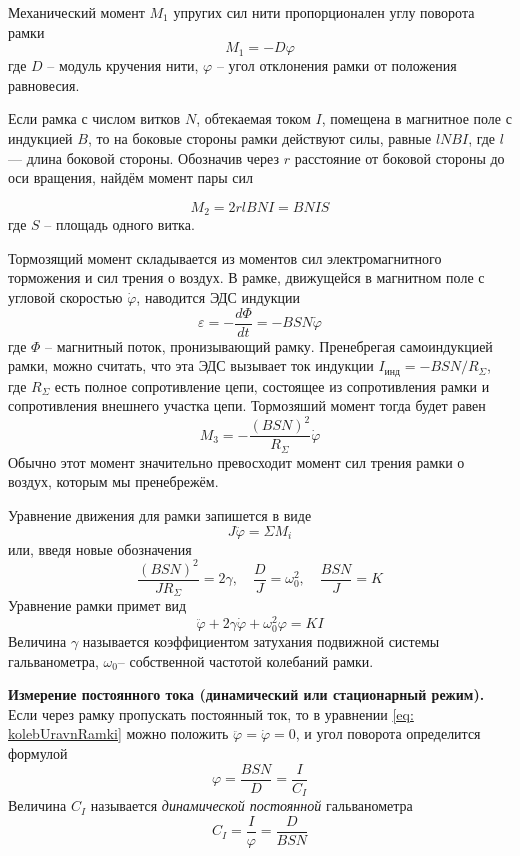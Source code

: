 \documentclass[a4paper,12pt]{article}
\begin{document}
Механический момент $M_1$ упругих сил нити пропорционален углу поворота рамки
\[M_1 = -D\varphi\]
где $D$ -- модуль кручения нити, $\varphi$ -- угол отклонения рамки от положения равновесия.

Если рамка с числом витков $N$, обтекаемая током $I$, помещена в магнитное поле с индукцией $B$, то на боковые стороны рамки действуют силы, равные $lNBI$, где $l$ — длина боковой стороны. Обозначив через $r$ расстояние от боковой стороны до оси вращения, найдём момент пары сил

\[M_2 = 2 r l B N I = B N I S\]
где $S$ -- площадь одного витка.

Тормозящий момент складывается из моментов сил электромагнитного торможения и сил трения о воздух. В рамке, движущейся в магнитном поле с угловой скоростью $\dot{\varphi}$, наводится ЭДС индукции
\[\varepsilon = - \frac{d\Phi}{dt} = - B S N \dot{\varphi} \]
где $\Phi$ -- магнитный поток, пронизывающий рамку. Пренебрегая самоиндукцией рамки, можно считать, что эта ЭДС вызывает ток индукции $I_{инд} = - B S N / R_\Sigma$, где $R_\Sigma$ есть полное сопротивление цепи, состоящее из сопротивления рамки и сопротивления внешнего участка цепи. Тормозяший момент тогда будет равен
\[M_3 = -\frac{(B S N)^2}{R_\Sigma} \dot{\varphi}\]
Обычно этот момент значительно превосходит момент сил трения рамки о воздух, которым мы пренебрежём.

Уравнение движения для рамки запишется в виде 
\[J\ddot{\varphi} = \Sigma M_i\]
или, введя новые обозначения
\[\frac{(B S N)^2}{J R_\Sigma} = 2\gamma, \quad \frac{D}{J} = \omega_0^2, \quad \frac{B S N}{J} = K\]
Уравнение рамки примет вид
\begin{equation}\label{eq: kolebUravnRamki}
    \ddot{\varphi} + 2\gamma \dot{\varphi} + \omega_0^2 \varphi = KI    
\end{equation}
Величина $\gamma$ называется коэффициентом затухания подвижной системы гальванометра,
$\omega_0$-- собственной частотой колебаний рамки.

\textbf{Измерение постоянного тока (динамический или стационарный
режим).}\\
Если через рамку пропускать постоянный ток, то в уравнении \eqref{eq: kolebUravnRamki} можно положить $\ddot{\varphi} = \dot{\varphi} = 0$, и угол поворота определится формулой
\[\varphi = \frac{B S N}{D} = \frac{I}{C_I}\]
Величина $C_I$ называется \textit{динамической постоянной} гальванометра
\begin{equation}\label{eq: izmerenieDynamicConst}
    C_I = \frac{I}{\varphi} = \frac{D}{B S N}
\end{equation}
\end{document}
